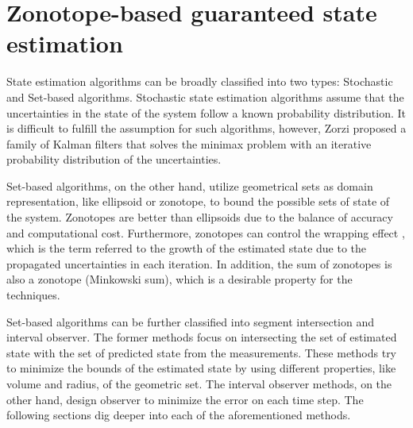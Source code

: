 \chapter{Zonotope-based guaranteed state estimation} \label{ch:state_estimation}
State estimation algorithms can be broadly classified into two types: Stochastic and Set-based algorithms. Stochastic state estimation algorithms assume that the uncertainties in the state of the system follow a known probability distribution. It is difficult to fulfill the assumption for such algorithms, however, Zorzi \cite{Zorzi2017} proposed a family of Kalman filters that solves the minimax problem with an iterative probability distribution of the uncertainties.

Set-based algorithms, on the other hand, utilize geometrical sets as domain representation, like ellipsoid or zonotope, to bound the possible sets of state of the system. Zonotopes are better than ellipsoids due to the balance of accuracy and computational cost. Furthermore, zonotopes can control the wrapping effect \cite{Kuhn1998}, which is the term referred to the growth of the estimated state due to the propagated uncertainties in each iteration. In addition, the sum of zonotopes is also a zonotope (Minkowski sum), which is a desirable property for the techniques.

Set-based algorithms can be further classified into segment intersection and interval observer. The former methods focus on intersecting the set of estimated state with the set of predicted state from the measurements. These methods try to minimize the bounds of the estimated state by using different properties, like volume and radius, of the geometric set. The interval observer methods, on the other hand, design observer to minimize the error on each time step. The following sections dig deeper into each of the aforementioned methods.

